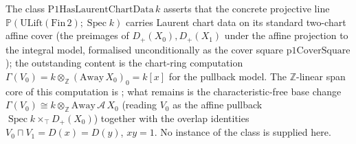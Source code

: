 \begin{definition}
  \label{def:adelic_P1HasLaurentChartData}
  \leanok
  The class \(\mathrm{P1HasLaurentChartData}\, k\) asserts that the
  concrete projective line \(\mathbb{P}(\mathrm{ULift}(\mathrm{Fin}\, 2);
  \operatorname{Spec} k)\) carries Laurent chart data on its standard
  two-chart affine cover (the preimages of \(D_+(X_0), D_+(X_1)\) under
  the affine projection to the integral model, formalised
  unconditionally as the cover square \(\mathrm{p1CoverSquare}\)); the
  outstanding content is the chart-ring computation
  \(\Gamma(V_0) = k \otimes_{\mathbb{Z}} (\mathrm{Away}\, X_0)_0 = k[x]\)
  for the pullback model. The \(\mathbb{Z}\)-linear span core of this
  computation is ; what
  remains is the characteristic-free base change
  \(\Gamma(V_0) \cong k \otimes_{\mathbb{Z}} \mathrm{Away}\,\mathcal
  A\,X_0\) (reading \(V_0\) as the affine pullback
  \(\operatorname{Spec} k \times_{\top} D_+(X_0)\)) together with the
  overlap identities \(V_0 \sqcap V_1 = D(x) = D(y)\), \(xy = 1\). No
  instance of the class is supplied here.
\end{definition}

